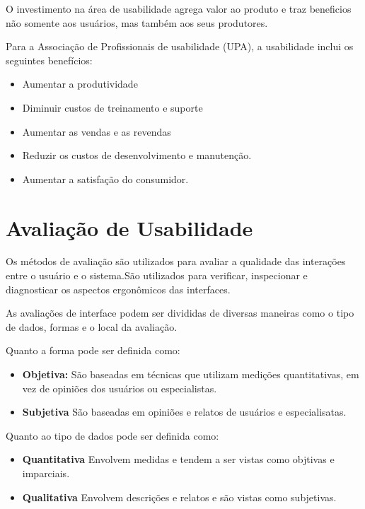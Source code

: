 	O investimento na área de usabilidade agrega valor ao produto e traz beneficios não somente aos usuários, mas também aos seus produtores. 

Para a Associação de Profissionais de usabilidade (UPA), a usabilidade inclui os seguintes benefícios:

\begin{itemize}
\item Aumentar a produtividade
\item Diminuir custos de treinamento e suporte
\item Aumentar as vendas e as revendas
\item Reduzir os custos de desenvolvimento e manutenção.
\item Aumentar a satisfação do consumidor.
\end{itemize}



\section {Avaliação de Usabilidade}

	
	Os métodos de avaliação são utilizados para avaliar a qualidade das interações entre o usuário e o sistema.São utilizados para verificar, inspecionar e diagnosticar os aspectos ergonômicos das interfaces.

	As avaliações de interface podem ser divididas de diversas maneiras como o tipo de dados, formas e o local da avaliação.

	Quanto a forma pode ser definida como:

	\begin{itemize}
		\item \textbf{Objetiva:} São baseadas em técnicas que utilizam medições quantitativas, em vez de opiniões dos usuários ou especialistas.
		\item \textbf{Subjetiva} São baseadas em opiniões e relatos de usuários e especialisatas.
	\end{itemize}

	Quanto ao tipo de dados pode ser definida como:

	\begin{itemize}
		\item \textbf{Quantitativa} Envolvem medidas e tendem a ser vistas como objtivas e imparciais.
		\item \textbf{Qualitativa} Envolvem descrições e relatos e são vistas como subjetivas.
	\end{itemize}

